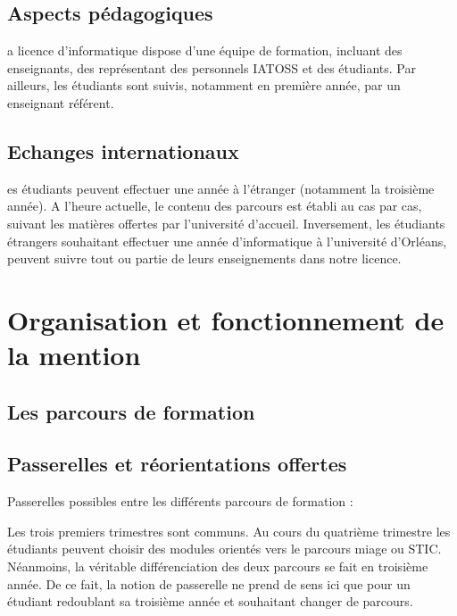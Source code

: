 \documentclass[10pt, a5paper]{report}
\begin{document}
\begin{spacing}{1.5}











\section*{Aspects pédagogiques}
a licence d'informatique dispose d'une équipe de formation, incluant des enseignants, des représentant des personnels IATOSS et des étudiants. Par ailleurs, les étudiants sont suivis, notamment en première année, par un enseignant référent.

\section*{Echanges internationaux}
es étudiants peuvent effectuer une année à l'étranger (notamment la troisième année). A l'heure actuelle, le contenu des parcours est établi au cas par cas, suivant les matières offertes par l'université d'accueil. Inversement, les étudiants étrangers souhaitant effectuer une année d'informatique à l'université d'Orléans, peuvent suivre tout ou partie de leurs enseignements dans notre licence. 


\chapter*{Organisation et fonctionnement de la mention}
\section*{Les parcours de formation}
\section*{Passerelles et réorientations offertes}
Passerelles possibles entre les différents parcours de formation :

Les trois premiers trimestres sont communs. Au cours du quatrième trimestre les étudiants peuvent choisir des modules orientés vers le parcours miage ou STIC. Néanmoins, la véritable différenciation des deux parcours se fait en troisième année. De ce fait, la notion de passerelle ne prend de sens ici que pour un étudiant redoublant sa troisième année et souhaitant changer de parcours.


\end{spacing}
\end{document}
